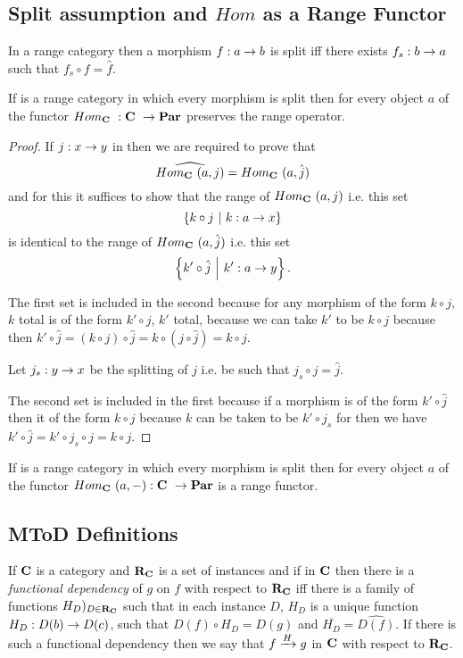 \documentclass[10pt,a4paper]{article}
\theoremstyle{remark}
\renewcommand{\term}[1]{\textit{#1}}  %
\begin{document}
\subsection{Split assumption and $Hom$ as a Range Functor}
\begin{definition}
In a range category \catcw then a morphism $f:a \morph b$ is split iff
there exists $f_s:b \morph a$ such that $f_s \circ f = \hat{f}$.
\end{definition}
\begin{lemma}
If \catcw is a range category in which every morphism is split then
for every object $a$ of \catcw the functor $Hom_\catcw: \catcw \morph \Par$ preserves the range operator.
\end{lemma}
\begin{proof}
If $j: x \morph y$ in \catcw then we are required to prove that
$$\widehat{Hom_\catcw(a,j)}=Hom_\catcw(a,\hat{j})$$
and for this it suffices to show that the range of $Hom_\catcw(a,j)$ i.e. this set
$$\setsuchthat{ k \circ j}{k: a \morph x }$$ 
is identical to the range of $Hom_\catcw(a,\hat{j})$ i.e. this set
$$\setsuchthat{k' \circ \hat{j}}{k':a \morph y}.$$

The first set is included in the second because for any morphism of the form $k \circ j$, $k$ total is of the form $k' \circ j$, $k'$ total, because we can take $k'$ to be $k \circ j$ because then $k' \circ \hat{j} = (k \circ j) \circ \hat{j}= k \circ(j \circ \hat{j})= k \circ j$. 

Let $j_s : y \morph x$ be the splitting of $j$ i.e. be such that $j_s \circ j = \hat{j}$.

The second set is included in the first because if a morphism is of the form $k' \circ \hat{j}$ then it of the form $k \circ j$ because $k$ can be taken to be $k' \circ j_s$ for then we have $k' \circ \hat{j} = k' \circ j_s \circ j = k \circ j$. 
 \end{proof}

\begin{corollary}
If \catcw is a range category in which every morphism is split then
for every object $a$ of \catcw the functor $Hom_\catcw(a,-): \catcw \morph \Par$ is a range functor.
\end{corollary}


\subsection{MToD Definitions}

\begin{definition}
If $\catc$ is a category and $\reqtc$ is a set of instances and if \fgsourcediag
in $\catc$ then there is a  \term{functional dependency} of $g$ on $f$ with respect to $\reqtc$ iff
there is a family of functions $H_D)_{D \in \reqtc}$ such that 
in each instance $D$, $H_D$ is a unique function $H_D: D(b) \morph D(c)$, such that $D(f) \circ H_D = D(g)$ and $\overline{H_D}=\widehat{D(f)}$.
If there is such a functional dependency then we say that $\fundep{H}{f}{g}$ in $\catc$ with respect to $\reqtc$.
\end{definition}
\end{document}
